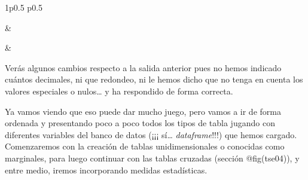 \documentclass[
]{book}
\begin{document}
\begin{table}[ht]
\begin{centerbox}
\begin{threeparttable}
\captionsetup{justification=centering,singlelinecheck=off}
\caption{\label{tab:unnamed-chunk-3} }
 \setlength{\tabcolsep}{0pt}
\begin{tabularx}{1\textwidth}{p{} p{}}


\hhline{}

 &
 \tabularnewline[-0.5pt]


\hhline{}

 &
 \tabularnewline[-0.5pt]


\hhline{}
\end{tabularx}
\end{threeparttable}\par\end{centerbox}

\end{table}
 

Verás algunos cambios respecto a la salida anterior pues no hemos indicado cuántos decimales, ni que redondeo, ni le hemos dicho que no tenga en cuenta los valores especiales o nulos\ldots{} y ha respondido de forma correcta.

Ya vamos viendo que eso puede dar mucho juego, pero vamos a ir de forma ordenada y presentando poco a poco todos los tipos de tabla jugando con diferentes variables del banco de datos (¡¡¡ sí\ldots{} \emph{dataframe}!!!) que hemos cargado. Comenzaremos con la creación de tablas unidimensionales o conocidas como marginales, para luego continuar con las tablas cruzadas (sección @fig(tse04)), y entre medio, iremos incorporando medidas estadísticas.
\end{document}
